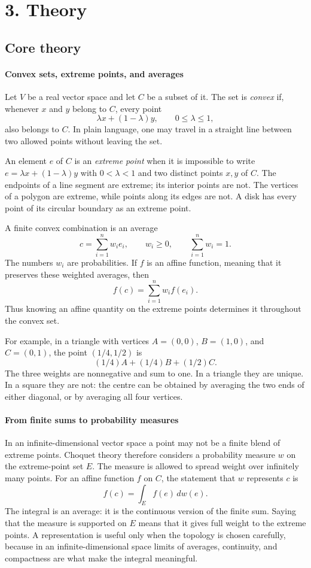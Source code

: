 \section*{3. Theory}
\subsection*{Core theory}
\paragraph{Convex sets, extreme points, and averages}

Let $V$ be a real vector space and let $C$ be a subset of it. The set is \emph{convex} if, whenever $x$ and $y$ belong to $C$, every point
\[
 \lambda x+(1-\lambda)y,\qquad 0\leq \lambda\leq 1,
\]
also belongs to $C$. In plain language, one may travel in a straight line between two allowed points without leaving the set.

An element $e$ of $C$ is an \emph{extreme point} when it is impossible to write
$e=\lambda x+(1-\lambda)y$ with $0<\lambda<1$ and two distinct points $x,y$ of $C$. The endpoints of a line segment are extreme; its interior points are not. The vertices of a polygon are extreme, while points along its edges are not. A disk has every point of its circular boundary as an extreme point.

A finite convex combination is an average
\[
 c=\sum_{i=1}^{n}w_i e_i,\qquad
 w_i\geq 0,\qquad \sum_{i=1}^{n}w_i=1.
\]
The numbers $w_i$ are probabilities. If $f$ is an affine function, meaning that it preserves these weighted averages, then
\[
 f(c)=\sum_{i=1}^{n}w_i f(e_i).
\]
Thus knowing an affine quantity on the extreme points determines it throughout the convex set.

For example, in a triangle with vertices $A=(0,0)$, $B=(1,0)$, and $C=(0,1)$, the point $(1/4,1/2)$ is
\[
 (1/4)A+(1/4)B+(1/2)C.
\]
 The three weights are nonnegative and sum to one. In a triangle they are unique. In a square they are not: the centre can be obtained by averaging the two ends of either diagonal, or by averaging all four vertices.

\paragraph{From finite sums to probability measures}

In an infinite-dimensional vector space a point may not be a finite blend of extreme points. Choquet theory therefore considers a probability measure $w$ on the extreme-point set $E$. The measure is allowed to spread weight over infinitely many points. For an affine function $f$ on $C$, the statement that $w$ represents $c$ is
\[
 f(c)=\int_E f(e)\,dw(e).
\]
The integral is an average: it is the continuous version of the finite sum. Saying that the measure is supported on $E$ means that it gives full weight to the extreme points. A representation is useful only when the topology is chosen carefully, because in an infinite-dimensional space limits of averages, continuity, and compactness are what make the integral meaningful.

